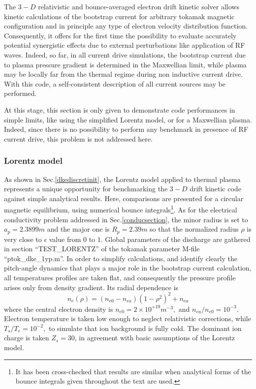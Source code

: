 

The $3-D$ relativistic and bounce-averaged electron drift kinetic solver
allows kinetic calculations of the bootstrap current for arbitrary tokamak
magnetic configuration and in principle any type of electron velocity
distribution function. Consequently, it offers for the first time the
possibility to evaluate accurately potential synergistic effects due to
external perturbations like application of RF waves. Indeed, so far, in all
current drive simulations, the bootstrap current due to plasma pressure
gradient is determined in the Maxwellian limit, while plasma may be locally
far from the thermal regime during non inductive current drive. With this
code, a self-consistent description of all current sources may be performed.

At this stage, this section is only given to demonstrate code performances
in simple limits, like using the simplified Lorentz model, or for a
Maxwellian plasma. Indeed, since there is no possibility to perform any
benchmark in presence of RF current drive, this problem is not addressed
here.

\subsubsection{Lorentz model\label{bootstrapsection}}

As shown in Sec.\ref{dkediscretinit}, the Lorentz model applied to thermal
plasma represents a unique opportunity for benchmarking the $3-D$ drift
kinetic code against simple analytical results. Here, comparisons are
presented for a circular magnetic equilibrium, using numerical bounce
integrals\footnote{%
It has been cross-checked that results are similar when analytical forms of
the bounce integrals given throughout the text are used.}. As for the
electrical conductivity problem addressed in Sec.\ref{conducsection}, the
minor radius is set to $a_{p}=2.3899m$ and the major one is $R_{p}=2.39m$ so
that the normalized radius $\rho $ is very close to $\epsilon $ value from $%
0 $ to $1$. Global parameters of the discharge are gathered in section
``TEST\_LORENTZ'' of the tokamak parameter M-file ``ptok\_dke\_1yp.m''. In
order to simplify calculations, and identify clearly the pitch-angle
dynamics that plays a major role in the bootstrap current calculation, all
temperatures profiles are taken flat, and consequently the pressure profile
arises only from density gradient. Its radial dependence is
\begin{equation}
n_{e}\left( \rho \right) =\left( n_{e0}-n_{ea}\right) \left( 1-\rho
^{2}\right) ^{2}+n_{ea}  \label{densityprofLor}
\end{equation}
where the central electron density is $n_{e0}=2\times 10^{+19}m^{-3},$ and $%
n_{ea}/n_{e0}=10^{-3}.$ Electron temperature is taken low enough to neglect
relativistic corrections, while $T_{s}/T_{e}=10^{-2},$ to simulate that ion
background is fully cold. The dominant ion charge is taken $Z_{s}=30$, in
agreement with basic assumptions of the Lorentz model.

